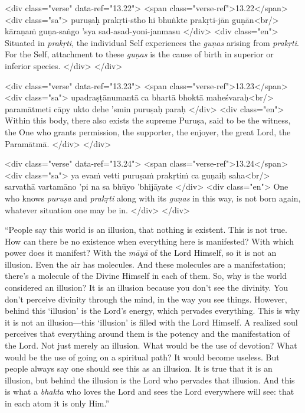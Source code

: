 \begin{html}
<div class="verse" data-ref="13.22">
  <span class="verse-ref">13.22</span>
  <div class="sa">
    puruṣaḥ prakṛti-stho hi bhuṅkte prakṛti-jān guṇān<br/>
    kāraṇaṁ guṇa-saṅgo ’sya sad-asad-yoni-janmasu
  </div>
  <div class="en">
    Situated in \textit{prakṛti}, the individual Self experiences the \textit{guṇas} arising from \textit{prakṛti}. For the Self, attachment to these \textit{guṇas} is the cause of birth in superior or inferior species.
  </div>
</div>
\end{html}



\begin{html}
<div class="verse" data-ref="13.23">
  <span class="verse-ref">13.23</span>
  <div class="sa">
    upadraṣṭānumantā ca bhartā bhoktā maheśvaraḥ<br/>
    paramātmeti cāpy ukto dehe ’smin puruṣaḥ paraḥ
  </div>
  <div class="en">
    Within this body, there also exists the supreme Puruṣa, said to be the witness, the One who grants permission, the supporter, the enjoyer, the great Lord, the Paramātmā.
  </div>
</div>
\end{html}



\begin{html}
<div class="verse" data-ref="13.24">
  <span class="verse-ref">13.24</span>
  <div class="sa">
    ya evaṁ vetti puruṣaṁ prakṛtiṁ ca guṇaiḥ saha<br/>
    sarvathā vartamāno ’pi na sa bhūyo ’bhijāyate
  </div>
  <div class="en">
    One who knows \textit{puruṣa} and \textit{prakṛti} along with its \textit{guṇas} in this way, is not born again, whatever situation one may be in.
  </div>
</div>
\end{html}


\enquote{People say this world is an illusion, that nothing is existent. This is not true. How can there be no existence when everything here is manifested? With which power does it manifest? With the \textit{māyā} of the Lord Himself, so it is not an illusion. Even the air has molecules. And these molecules are a manifestation; there’s a molecule of the Divine Himself in each of them. So, why is the world considered an illusion? It is an illusion because you don’t see the divinity. You don’t perceive divinity through the mind, in the way you see things. However, behind this \enquote{illusion} is the Lord’s energy, which pervades everything. This is why it is not an illusion---this \enquote{illusion} is filled with the Lord Himself. A realized soul perceives that everything around them is the potency and the manifestation of the Lord. Not just merely an illusion. What would be the use of devotion? What would be the use of going on a spiritual path? It would become useless. But people always say one should see this as an illusion. It is true that it is an illusion, but behind the illusion is the Lord who pervades that illusion. And this is what a \textit{bhakta} who loves the Lord and sees the Lord everywhere will see: that in each atom it is only Him.}

